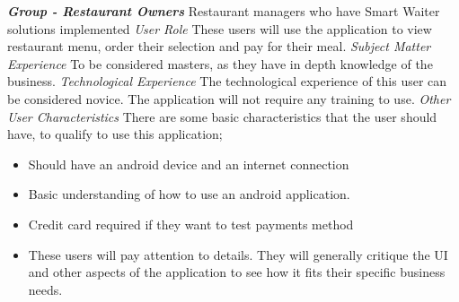 \documentclass[12pt, titlepage]{article}
\begin{document}
\noindent\textbf{\textit{Group - Restaurant Owners}}\newline
Restaurant managers who have Smart Waiter solutions implemented \newline
\newline
\textit{User Role}\newline
These users will use the application to view restaurant menu, order their selection and pay for their meal.\newline\newline
\textit{Subject Matter Experience}\newline
To be considered masters, as they have in depth knowledge of the business. \newline\newline
\textit{Technological Experience}\newline
The technological experience of this user can be considered novice. The application will not require any training to use. \newline\newline
\textit{Other User Characteristics}\newline
There are some basic characteristics that the user should have, to qualify to use this application;
\begin{itemize}
  \item Should have an android device and an internet connection
  \item Basic understanding of how to use an android application. 
  \item 	Credit card required if they want to test payments method 
  \item 	These users will pay attention to details. They will generally critique the UI and other aspects of the application to see how it fits their specific business needs.
\end{itemize}
\end{document}
